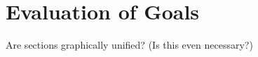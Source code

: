 

\section{Evaluation of Goals} %
\label{sec:evaluation_of_goals}
	Are sections graphically unified? (Is this even necessary?)





